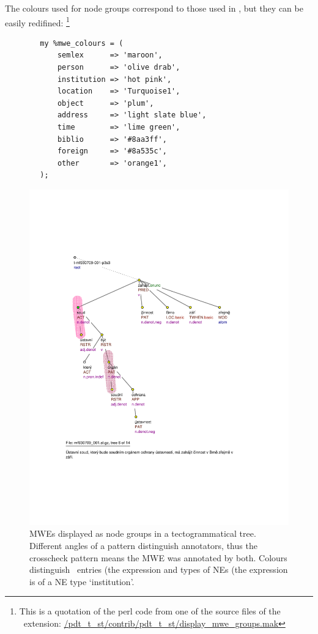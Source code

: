 The colours used for node groups correspond to those used in \seman, but they can be easily redifined:%
\footnote{This is a quotation of the perl code from one of the source files of the \tred\ extension: \url{/pdt_t_st/contrib/pdt_t_st/display_mwe_groups.mak}} 
%
\begin{verbatim}
        my %mwe_colours = (
            semlex      => 'maroon',
            person      => 'olive drab',
            institution => 'hot pink',
            location    => 'Turquoise1',
            object      => 'plum',
            address     => 'light slate blue',
            time        => 'lime green',
            biblio      => '#8aa3ff',
            foreign     => '#8a535c',
            other       => 'orange1',
        );
\end{verbatim}


\begin{figure}[htbp]
   \centering
   \includegraphics[width=\textwidth]{images/bubliny.pdf} 
   \caption{MWEs displayed as node groups in a tectogrammatical tree. Different angles of a pattern distinguish annotators, thus the crosscheck pattern means the MWE was annotated by both. Colours distinguish \semlex\ entries (the expression  and types of NEs (the expression  is of a NE type `institution'.}
   \label{fig:nodegroups}
\end{figure}

